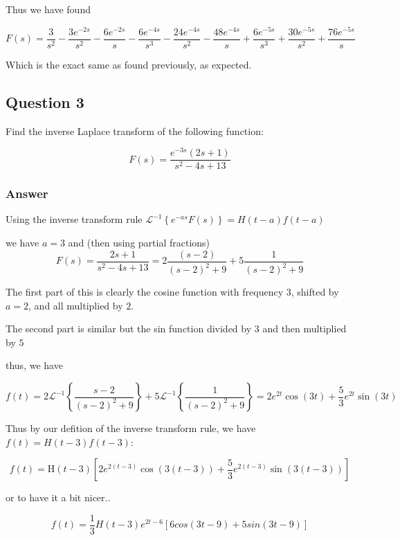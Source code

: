 \documentclass{article}
\begin{document}
Thus we have found

$$F(s) = \frac{3}{s^2} -\frac{3e^{-2s}}{s^2} - \frac{6e^{-2s}}{s} -\frac{6e^{-4s}}{s^3}-\frac{24e^{-4s}}{s^2}-\frac{48e^{-4s}}{s} + \frac{6e^{-5s}}{s^3}+\frac{30e^{-5s}}{s^2}+\frac{76e^{-5s}}{s}$$

Which is the exact same as found previously, as expected.


\subsection*{Question 3}

Find the inverse Laplace transform of the following function:

$$F(s) = \frac{e^{-3s}\left(2s+1\right)}{s^2-4s+13}$$

\subsubsection*{Answer}
Using the inverse transform rule $\mathcal{L}^{-1}\left\{e^{-as}F\left(s\right)\right\}=H\left(t-a\right)f\left(t-a\right)$

we have $a=3$ and (then using partial fractions)
$$F(s) = \frac{2s+1}{s^2-4s+13} = 2 \frac{(s-2)}{\left(s-2\right)^2+9}+5\frac{1}{\left(s-2\right)^2+9}$$

The first part of this is clearly the cosine function with frequency $3$, shifted by $a=2$, and all multiplied by $2$.

The second part is similar but the sin function divided by $3$ and then multiplied by $5$

thus, we have

$$f(t) = 2\mathcal{L}^{-1}\left\{\frac{s-2}{\left(s-2\right)^2+9}\right\}+5\mathcal{L}^{-1}\left\{\frac{1}{\left(s-2\right)^2+9}\right\} = 2e^{2t}\cos \left(3t\right)+\frac{5}{3}e^{2t}\sin \left(3t\right)$$

Thus by our defition of the inverse transform rule, we have $f(t) = H(t-3)f(t-3)$:

$$f(t) = \text{H}\left(t-3\right)\left[2e^{2\left(t-3\right)}\cos \left(3\left(t-3\right)\right)+\frac{5}{3}e^{2\left(t-3\right)}\sin \left(3\left(t-3\right)\right)\right]$$

or to have it a bit nicer..

$$f(t) = \frac{1}{3} H(t-3) e^{2t-6} \left[6cos\left(3t-9\right)+5sin\left(3t-9\right)\right]$$
\end{document}

